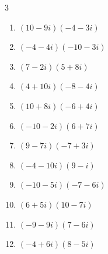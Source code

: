 \begin{multicols}{3}
\begin{enumerate}
        \phantom{$\displaystyle =13+13i$}

  \item $\displaystyle (10-9i)(-4-3i)$

        \phantom{$\displaystyle =-67+6i$}

  \item $\displaystyle (-4-4i)(-10-3i)$

        \phantom{$\displaystyle =28+52i$}

\columnbreak %

\resetques

  \item $\displaystyle (7-2i)(5+8i)$

        \phantom{$\displaystyle =51+46i$}

  \item $\displaystyle (4+10i)(-8-4i)$

        \phantom{$\displaystyle =8-96i$}

  \item $\displaystyle (10+8i)(-6+4i)$

        \phantom{$\displaystyle =-92-8i$}

  \item $\displaystyle (-10-2i)(6+7i)$

        \phantom{$\displaystyle =-46-82i$}

  \item $\displaystyle (9-7i)(-7+3i)$

        \phantom{$\displaystyle =-42+76i$}

  \item $\displaystyle (-4-10i)(9-i)$

        \phantom{$\displaystyle =-46-86i$}

  \item $\displaystyle (-10-5i)(-7-6i)$

        \phantom{$\displaystyle =40+95i$}

  \item $\displaystyle (6+5i)(10-7i)$

        \phantom{$\displaystyle =95+8i$}

  \item $\displaystyle (-9-9i)(7-6i)$

        \phantom{$\displaystyle =-117-9i$}

  \item $\displaystyle (-4+6i)(8-5i)$

        \phantom{$\displaystyle =-2+68i$}


\end{enumerate}
\end{multicols}
